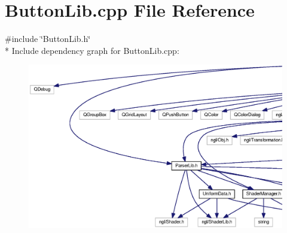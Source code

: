 \section{Button\-Lib.\-cpp File Reference}
\label{_button_lib_8cpp}
{\ttfamily \#include \char`\"{}Button\-Lib.\-h\char`\"{}}\\*
Include dependency graph for Button\-Lib.\-cpp\-:
\nopagebreak
\begin{figure}[H]
\begin{center}
\leavevmode
\includegraphics[width=350pt]{_button_lib_8cpp__incl}
\end{center}
\end{figure}
